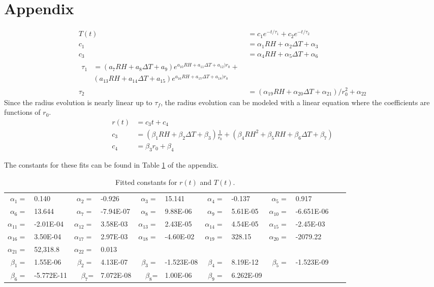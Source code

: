\documentclass[10pt,a4paper]{article}
\begin{document}
\newpage
\section{Appendix}

\begin{align}
T(t) &= c_1e^{-t/\tau_1}+c_2e^{-t/\tau_2} \\
c_1 &= \alpha_1 RH + \alpha_2 \Delta T + \alpha_3 \\
c_3 &= \alpha_4 RH + \alpha_5 \Delta T + \alpha_6  \\
\begin{split}
\tau_1 &= (a_7RH+a_8 \Delta T+a_9) e^{a_{10}RH+a_{11}\Delta T+a_{12})r_0}+\\
&(a_{13}RH+a_{14} \Delta T+a_{15}) e^{a_{16}RH+a_{17} \Delta T+a_{18})r_0}
\end{split}\\
\tau_2 &= (\alpha_{19} RH+\alpha_{20} \Delta T+\alpha_{21})/r_0^2+\alpha_{22} 
\end{align}
Since the radius evolution is nearly linear up to $\tau_f$, the radius evolution can be modeled with a linear equation where the coefficients are functions of $r_0$.
\begin{align}
 r(t) &= c_3 t + c_4 \\
c_3 &= (\beta_1 RH+\beta_2 \Delta T+\beta_3)\frac{1}{r_0}+(\beta_4 RH^2+\beta_5 RH+\beta_6 \Delta T+\beta_7) \\
c_4 &= \beta_3 r_0+\beta_4 
\end{align}

The constants for these fits can be found in Table \ref{tab:coeffs} of the appendix.

\begin{table}[!h]
\centering
\caption{Fitted constants for $r(t)$ and $T(t)$. \label{tab:coeffs}}
\hspace*{-0.25in}\begin{tabular}{rlrlrlrlrlrl}
$\alpha_{1}=$ & 0.140 & $\alpha_{2}=$ & -0.926 & $\alpha_{3}=$ & 15.141 & $\alpha_{4}=$ & -0.137 & $\alpha_{5}=$ & 0.917 &  \\
$\alpha_{6}=$ & 13.644  & $\alpha_{7}=$ & -7.94E-07  & $\alpha_{8}=$ & 9.88E-06 & $\alpha_{9}=$ &  5.61E-05& $\alpha_{10}=$ & -6.651E-06 & \\
  $\alpha_{11}=$  & -2.01E-04 & $\alpha_{12}=$ & 3.58E-03 & $\alpha_{13}=$ & 2.43E-05  & $\alpha_{14}=$ & 4.54E-05 & $\alpha_{15}=$ &  -2.45E-03 & \\
$\alpha_{16}=$ & 3.50E-04&   $\alpha_{17}=$  & 2.97E-03& $\alpha_{18}=$ & -4.60E-02 & $\alpha_{19}=$ & 328.15 & $\alpha_{20}=$ & -2079.22 & \\
$\alpha_{21}=$ &  52,318.8 & $\alpha_{22}=$ &0.013&   & & & \\
 $\beta_{1}=$ & 1.55E-06 & $\beta_{2}=$ & 4.13E-07 & $\beta_{3}=$ & -1.523E-08 & $\beta_{4}=$& 8.19E-12 & $\beta_5=$ & -1.523E-09 \\
 $\beta_6=$ &-5.772E-11 & $\beta_7$= & 7.072E-08 & $\beta_8$= & 1.00E-06 & $\beta_9=$ &6.262E-09\\
\end{tabular}
\end{table} 
 
 
 
\newpage



 
 
\end{document}
